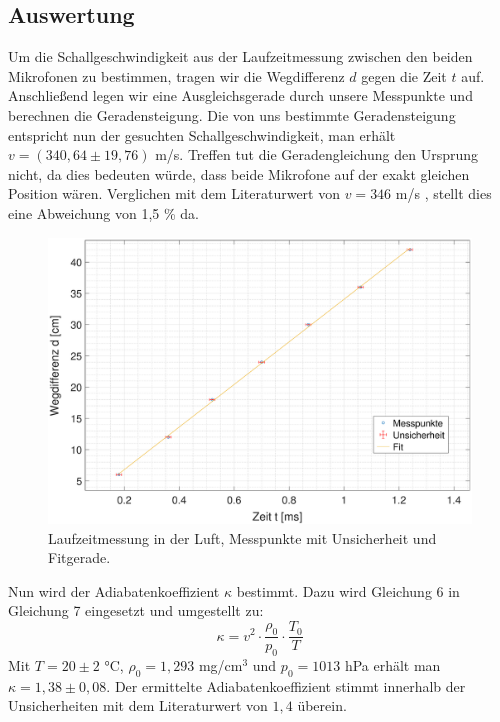 \documentclass{article}
\begin{document}
\subsection{Auswertung}
Um die Schallgeschwindigkeit aus der Laufzeitmessung zwischen den beiden Mikrofonen zu bestimmen, tragen wir die Wegdifferenz $d$ gegen die Zeit $t$ auf.
Anschließend legen wir eine Ausgleichsgerade durch unsere Messpunkte und berechnen die Geradensteigung. 
Die von uns bestimmte Geradensteigung entspricht nun der gesuchten Schallgeschwindigkeit, man erhält $v = (340,64 \pm 19,76)$ m/s. Treffen tut die Geradengleichung den Ursprung nicht, da dies bedeuten würde, dass beide Mikrofone auf der exakt gleichen Position wären. Verglichen mit dem Literaturwert von $v=346$ m/s \cite{2}, stellt dies eine Abweichung von 1,5 \% da.


\begin{figure}[hbt!]
\centering
\includegraphics[scale=0.38]{laufzeit_luft.eps}
\caption{Laufzeitmessung in der Luft, Messpunkte mit Unsicherheit und Fitgerade.}
\end{figure}

Nun wird der Adiabatenkoeffizient $\kappa$ bestimmt. Dazu wird Gleichung 6 in Gleichung 7 eingesetzt und umgestellt zu:
\begin{equation}
\kappa = v^2 \cdot \frac{\rho_0}{p_0}\cdot \frac{T_0}{T}
\end{equation}
Mit $T=20\pm 2$ °C, $\rho_0 = 1,293$ \textrm{mg/cm$^3$} \cite{1}  \textrm{ und } $p_0=1013$ hPa \cite{1} erhält man $\kappa = 1,38 \pm 0,08$.
Der ermittelte Adiabatenkoeffizient stimmt innerhalb der Unsicherheiten mit dem Literaturwert von $1,4$ \cite{4} überein.
\end{document}
